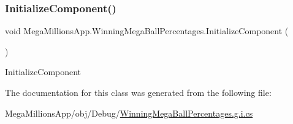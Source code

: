 \subsubsection{\texorpdfstring{Initialize\+Component()}{InitializeComponent()}}
{\footnotesize\ttfamily void Mega\+Millions\+App.\+Winning\+Mega\+Ball\+Percentages.\+Initialize\+Component (\begin{DoxyParamCaption}{ }\end{DoxyParamCaption})}



Initialize\+Component 



The documentation for this class was generated from the following file\+:\begin{DoxyCompactItemize}
\item 
Mega\+Millions\+App/obj/\+Debug/\hyperlink{_winning_mega_ball_percentages_8g_8i_8cs}{Winning\+Mega\+Ball\+Percentages.\+g.\+i.\+cs}\end{DoxyCompactItemize}
